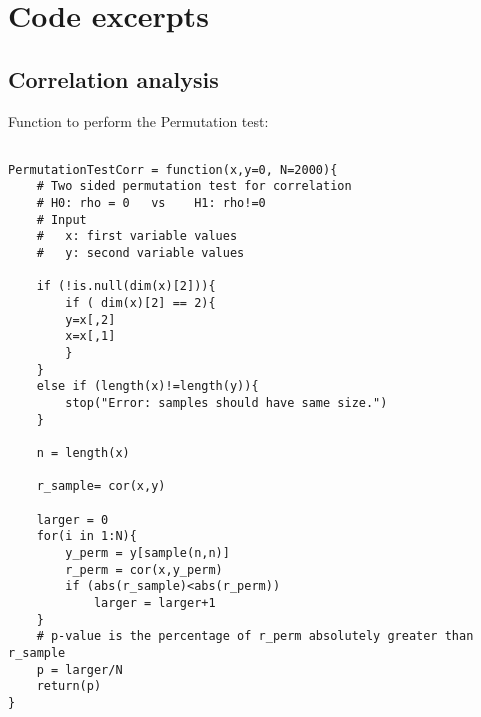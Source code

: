 \chapter{Code excerpts}
\label{app:code}

%


\section{Correlation analysis}
Function to perform the Permutation test:
\begin{lstlisting}

PermutationTestCorr = function(x,y=0, N=2000){
	# Two sided permutation test for correlation
	# H0: rho = 0   vs    H1: rho!=0
	# Input
	#   x: first variable values
	#   y: second variable values
	
	if (!is.null(dim(x)[2])){
		if ( dim(x)[2] == 2){
		y=x[,2]
		x=x[,1]
		}
	}
	else if (length(x)!=length(y)){
		stop("Error: samples should have same size.")
	}
	
	n = length(x)
	
	r_sample= cor(x,y)
	
	larger = 0
	for(i in 1:N){
		y_perm = y[sample(n,n)]
		r_perm = cor(x,y_perm)
		if (abs(r_sample)<abs(r_perm))
			larger = larger+1
	}
	# p-value is the percentage of r_perm absolutely greater than r_sample
	p = larger/N
	return(p)
} 
\end{lstlisting}

